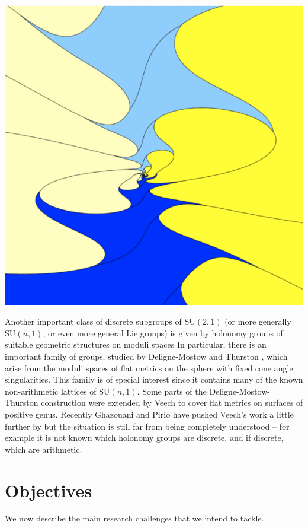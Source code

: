 \documentclass[14pt,fleqn]{article}
\begin{document}
\begin{center}
\includegraphics[scale=.15]{cplx_hyp.png} 
\end{center}


Another important class of discrete subgroups of $\mathrm{SU}(2,1)$ (or more
generally $\mathrm{SU}(n,1)$, 
or even more general Lie groups) is given by
holonomy groups of suitable geometric structures on moduli spaces 
In particular,
there is an important family of groups,
studied by Deligne-Mostow \cite{delignemostow}   and Thurston \cite{thurstonshapes},
which arise from
the moduli spaces of flat metrics on the sphere with fixed cone angle singularities.
This family is of special interest 
since it contains many of the 
known non-arithmetic lattices of $\mathrm{SU}(n,1)$.
Some parts of the  Deligne-Mostow-Thurston construction 
were extended by 
Veech \cite{veech}  to cover flat metrics on surfaces of positive genus.
Recently Ghazouani and Pirio \cite{ghazouanipirio}
have  pushed Veech's work a little further by 
but
the situation is still far from being completely understood -- for example it is not known which
holonomy groups are discrete, and if discrete, which are arithmetic.




\section{Objectives}
We now describe the main research challenges that we intend to tackle. 
\end{document}
